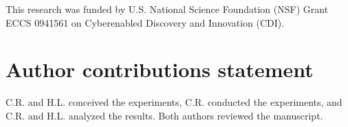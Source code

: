 \documentclass{article}
\begin{document}

This research was funded by U.S. National Science Foundation (NSF) Grant ECCS 0941561 on
Cyberenabled Discovery and Innovation (CDI).

\section*{Author contributions statement}


C.R. and H.L. conceived the experiments, C.R. conducted the experiments, and C.R. and H.L. analyzed
the results. Both authors reviewed the manuscript.

%
%



\end{document}
